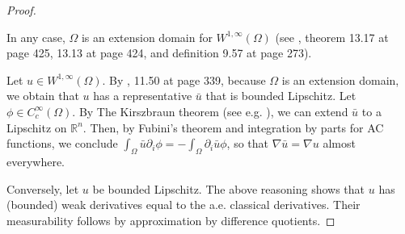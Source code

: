 \documentclass[english,a4paper,10pt,oneside]{scrbook}	%
\theoremstyle{break}
\newenvironment{mproof}[1][\proofname]{%
  \begin{proof}[#1]$ $\par\nobreak\ignorespaces
}{%
  \end{proof}
}
\renewcommand*{\proofname}{Proof}
\theoremstyle{remark}
\newcommand{\ds}{\displaystyle}
\newcommand{\cc}{\subset\subset}
\begin{document}
\begin{appendices}
\begin{mproof}
%
%
%
%

In any case, $\Omega$ is an extension domain for $W^{1,\infty}(\Omega)$ (see \cite{leoni}, theorem 13.17 at page 425, 13.13 at page 424, and definition 9.57 at page 273).

Let $u \in  W^{1,\infty}(\Omega)$. By \cite{leoni}, 11.50 at page 339, because $\Omega$ is an extension domain, we obtain that $u$ has a representative $\bar{u}$ that is bounded Lipschitz. Let $\phi \in C_c^\infty(\Omega)$. By The Kirszbraun theorem (see e.g. \cite{kirszbraun}), we can extend $\bar{u}$ to a Lipschitz on $\mathbb{R}^n$. Then, by Fubini's theorem and integration by parts for AC functions, we conclude $\ds \int_\Omega\bar{u}\partial_i\phi =-\int_{\Omega} \partial_i \bar{u} \phi $, so that $\nabla \bar{u} = \nabla u$ almost everywhere.

Conversely, let $u$ be bounded Lipschitz. The above reasoning shows that $u$ has (bounded) weak derivatives equal to the a.e. classical derivatives. Their measurability follows by approximation by difference quotients.
\end{mproof}


\end{appendices}
\end{document}
